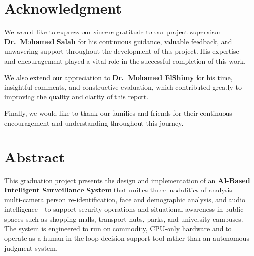 \documentclass[12pt]{report}
\begin{document}
\tableofcontents
\newpage

\listoffigures
\newpage

\listoftables
\newpage

\chapter*{Acknowledgment}

We would like to express our sincere gratitude to our project supervisor \textbf{Dr.\ Mohamed Salah} for his continuous guidance, valuable feedback, and unwavering support throughout the development of this project. His expertise and encouragement played a vital role in the successful completion of this work.

\vspace{0.5em}
\noindent We also extend our appreciation to \textbf{Dr.\ Mohamed ElShimy} for his time, insightful comments, and constructive evaluation, which contributed greatly to improving the quality and clarity of this report.

\vspace{0.5em}
\noindent Finally, we would like to thank our families and friends for their continuous encouragement and understanding throughout this journey.

\newpage

\chapter*{Abstract}

This graduation project presents the design and implementation of an \textbf{AI-Based Intelligent Surveillance System} that unifies three modalities of analysis---multi-camera person re-identification, face and demographic analysis, and audio intelligence---to support security operations and situational awareness in public spaces such as shopping malls, transport hubs, parks, and university campuses. The system is engineered to run on commodity, CPU-only hardware and to operate as a human-in-the-loop decision-support tool rather than an autonomous judgment system.
\end{document}
